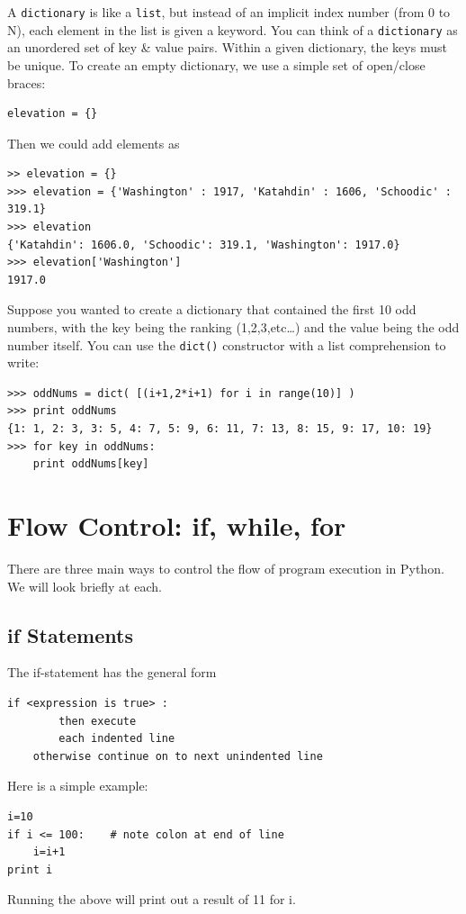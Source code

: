 A \texttt{dictionary} is like a \texttt{list}, but instead of an implicit index number (from 0 to N), each element in the list is given a keyword. You can think of a \texttt{dictionary} as an unordered set of  key \& value pairs. Within a given dictionary, the keys must be unique. To create an empty dictionary, we use a simple set of open/close braces:
\begin{lstlisting}
elevation = {}
\end{lstlisting}
Then we could add elements as 
\begin{lstlisting}
>> elevation = {}
>>> elevation = {'Washington' : 1917, 'Katahdin' : 1606, 'Schoodic' : 319.1}
>>> elevation
{'Katahdin': 1606.0, 'Schoodic': 319.1, 'Washington': 1917.0}
>>> elevation['Washington']
1917.0
\end{lstlisting}
Suppose you wanted to create a dictionary that contained the first 10 odd numbers, with the key being the ranking (1,2,3,etc\ldots) and the value being the odd number itself. You can use the \texttt{dict()} constructor with a list comprehension to write:
\begin{lstlisting}
>>> oddNums = dict( [(i+1,2*i+1) for i in range(10)] )
>>> print oddNums
{1: 1, 2: 3, 3: 5, 4: 7, 5: 9, 6: 11, 7: 13, 8: 15, 9: 17, 10: 19}
>>> for key in oddNums:
	print oddNums[key]
\end{lstlisting}




\section{Flow Control: if, while, for}
\label{sec-flow}
There are three main ways to control the flow of program execution in Python. We will look briefly at each. 

\subsection{if Statements}
\label{subsec-if}
The if-statement has the general form 
\begin{lstlisting}[frame=none]
	if <expression is true> :
		then execute
		each indented line
	otherwise continue on to next unindented line
\end{lstlisting}
Here is a simple example:
\begin{lstlisting}[frame=none]
i=10
if i <= 100:	# note colon at end of line
	i=i+1
print i
\end{lstlisting}
Running the above will print out a result of 11 for i. 

